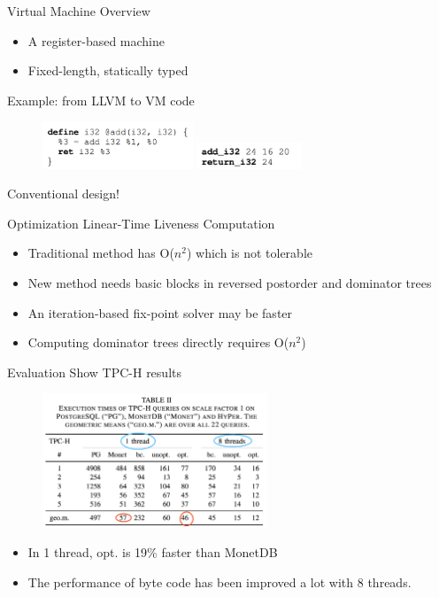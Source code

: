 \begin{frame}{Virtual Machine}
Overview
\begin{itemize}
\item A register-based machine
\item Fixed-length, statically typed
\end{itemize}
Example: from LLVM to VM code
\begin{figure}[htb]
\includegraphics[width=0.4\textwidth]{fig/adaptive-code1.png}
\includegraphics[width=0.28\textwidth]{fig/adaptive-code2.png}
\end{figure} 
\pause
\large{Conventional design!}
\end{frame}

\begin{frame}{Optimization}
Linear-Time Liveness Computation
\begin{itemize}
\item Traditional method has O($n^2$) which is not tolerable
\item New method needs basic blocks in reversed postorder and dominator trees
\end{itemize}
\pause
{}
\begin{itemize}
\item An iteration-based fix-point solver may be faster
\item Computing dominator trees directly requires O($n^2$)
\end{itemize}
\end{frame}

\begin{frame}{Evaluation}
Show TPC-H results
\begin{figure}[htb]
\includegraphics[width=0.6\textwidth]{fig/adaptive-table2.png}
\end{figure} 
\begin{itemize}
\item In 1 thread, opt. is 19\% faster than MonetDB
\item The performance of byte code has been improved a lot with 8 threads.
\end{itemize}
\end{frame}

